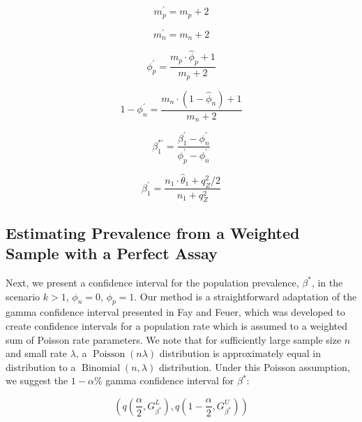 \documentclass[AMA,STIX1COL]{WileyNJD-v2}
\begin{document}
\begin{equation}
    m_p^\prime = m_p +2
\end{equation}

\begin{equation}
    m_n^\prime = m_n + 2
\end{equation}

\begin{equation}
    \phi_p^\prime = \frac{m_p \cdot \hat{\phi}_p + 1}{m_p + 2}
\end{equation}

\begin{equation}
   1 - \phi_n^\prime = \frac{m_n \cdot (1 - \hat{\phi}_n) + 1}{m_n + 2} 
\end{equation}

\begin{equation}
   \beta_1^{*\prime} = \frac{\beta_1^\prime - \phi_n^\prime}{\phi_p^\prime - \phi_n^\prime} 
\end{equation}

\begin{equation}
    \beta_1^\prime = \frac{n_1 \cdot \hat{\theta}_1 + q_Z^2 / 2}{n_1 + q_Z^2}
\end{equation}

\subsection{Estimating Prevalence from a Weighted Sample with a Perfect Assay}
\label{sec:weight-perfect}

Next, we present a confidence interval for the population prevalence, \( \beta^* \), in the scenario \( k > 1 \), \( \phi_n = 0 \), \( \phi_p = 1 \).
Our method is a straightforward adaptation of the gamma confidence interval presented in Fay and Feuer\cite{FayF:1997}, which was developed to create confidence intervals for a population rate which is assumed to a weighted sum of Poisson rate parameters.
We note that for sufficiently large sample size \( n \) and small rate \( \lambda \), a \( \operatorname{Poisson}(n\lambda) \) distribution is approximately equal in distribution to a \( \operatorname{Binomial}(n, \lambda) \) distribution.
Under this Poisson assumption, we suggest the \( 1 - \alpha \)\% gamma confidence interval for \( \beta^* \):

\begin{equation}
    \left( q\left( \frac{\alpha}{2}, G_{\beta^*}^L \right), q \left( 1 - \frac{\alpha}{2},  G_{\beta^*}^U \right) \right)
\end{equation}
\end{document}
